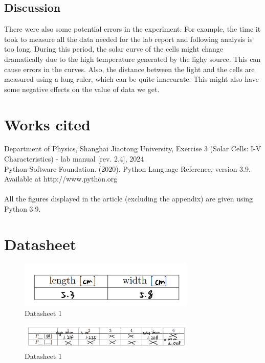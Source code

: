 \documentclass[12pt, a4paper, oneside]{article}
\begin{document}
\subsection{Discussion}
\indent

There were also some potential errors in the experiment. For example, the time it took to measure all the data needed
for the lab report and following analysis is too long. During this period, the solar curve of the cells might 
change dramatically due to the high temperature generated by the lighy source. This can cause errors in the curves.
Also, the distance between the light and the cells are measured using a long ruler, which can be quite inaccurate.
This might also have some negative effects on the value of data we get.


\section{Works cited}
Department of Physics, Shanghai Jiaotong University, Exercise 3 (Solar Cells: I-V Characteristics) - lab manual [rev. 2.4], 2024\\
Python Software Foundation. (2020). Python Language Reference, version 3.9. Available at http://www.python.org\\
\\
All the figures displayed in the article (excluding the appendix) are given using Python 3.9.
\pagebreak
\appendix
\section{Datasheet}

\begin{figure}[htbp]
	\centering
	\includegraphics[width=0.75\textwidth]{D1.png}
	\caption{Datasheet 1}
\end{figure}

\begin{figure}[htbp]
	\centering
	\includegraphics[width=0.75\textwidth]{D2.png}
	\caption{Datasheet 1}
\end{figure}
\end{document}

